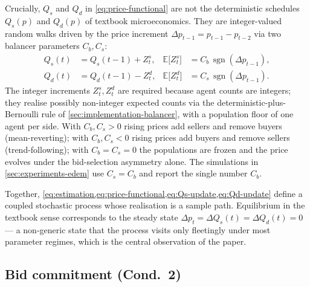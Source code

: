 Crucially, $Q_{s}$ and $Q_{d}$ in \cref{eq:price-functional} are not
the deterministic schedules $Q_{s}(p)$ and $Q_{d}(p)$ of textbook
microeconomics. They are integer-valued random walks driven by the
price increment $\Delta p_{t-1} = p_{t-1} - p_{t-2}$ via two balancer
parameters $C_{b}, C_{s}$:
\begin{align}
\label{eq:Qs-update}
Q_{s}(t) &= Q_{s}(t-1) + Z^{s}_{t},
& \mathbb{E}\bigl[Z^{s}_{t}\bigr] &= C_{b}\,\operatorname{sgn}(\Delta p_{t-1}), \\
\label{eq:Qd-update}
Q_{d}(t) &= Q_{d}(t-1) - Z^{d}_{t},
& \mathbb{E}\bigl[Z^{d}_{t}\bigr] &= C_{s}\,\operatorname{sgn}(\Delta p_{t-1}).
\end{align}
The integer increments $Z^{s}_{t}, Z^{d}_{t}$ are required because
agent counts are integers; they realise possibly non-integer expected
counts via the deterministic-plus-Bernoulli rule of
\cref{sec:implementation-balancer}, with a population floor of one
agent per side. With $C_{b}, C_{s} > 0$ rising prices add sellers
and remove buyers (mean-reverting); with $C_{b}, C_{s} < 0$ rising
prices add buyers and remove sellers (trend-following); with
$C_{b} = C_{s} = 0$ the populations are frozen and the price evolves
under the bid-selection asymmetry alone. The simulations in
\cref{sec:experiments-edem} use $C_{s} = C_{b}$ and report the
single number $C_{b}$.

Together,
\cref{eq:estimation,eq:price-functional,eq:Qs-update,eq:Qd-update}
define a coupled stochastic process whose realisation is a sample
path. Equilibrium in the textbook sense corresponds to the steady
state $\Delta p_{t} = \Delta Q_{s}(t) = \Delta Q_{d}(t) = 0$ --- a
non-generic state that the process visits only fleetingly under most
parameter regimes, which is the central observation of the paper.

\subsection{Bid commitment (Cond.~2)}
\label{sec:framework-cond2}

